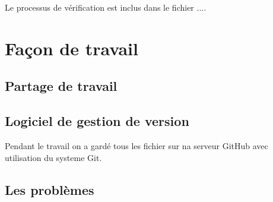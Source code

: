 \documentclass[10pt, a4paper]{article}
\begin{document}
	
	Le processus de vérification est inclus dans le fichier ....
	\section{Façon de travail}
		\subsection{Partage de travail}
		
		
		\subsection{Logiciel de gestion de version}
		Pendant le travail on a gardé tous les fichier sur na serveur GitHub avec utilisation du systeme 
		Git.
		
		\subsection{Les problèmes}
		
		
	


\end{document}
